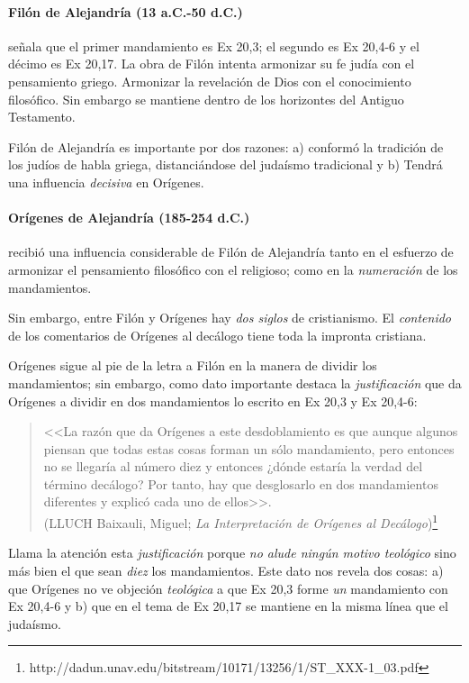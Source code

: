 \documentclass{article}
\begin{document}
\paragraph{Fil\'on de Alejandr\'{i}a  (13 a.C.-50 d.C.)}

se\~nala que el primer mandamiento es Ex 20,3; el segundo es Ex 20,4-6 y el d\'ecimo es Ex 20,17. La obra de Fil\'on intenta armonizar su fe jud\'{i}a con el pensamiento griego. Armonizar la revelaci\'on de Dios con el conocimiento filos\'ofico. Sin embargo se mantiene dentro de los horizontes del Antiguo Testamento.

Fil\'on de Alejandr\'{i}a es importante por dos razones: a) conform\'o la tradici\'on de los jud\'{i}os de habla griega, distanci\'andose del juda\'{i}smo tradicional y b) Tendr\'a una influencia \emph{decisiva} en Or\'{i}genes.

\paragraph{Or\'{i}genes de Alejandr\'{i}a (185-254 d.C.)}

recibi\'o una influencia considerable de Fil\'{o}n de Alejandr\'{i}a tanto en el esfuerzo de armonizar el pensamiento filos\'{o}fico con el religioso; como en la \emph{numeraci\'on} de los mandamientos.

Sin embargo, entre Fil\'on y Or\'{i}genes hay \emph{dos siglos} de cristianismo. El \emph{contenido} de los comentarios de Or\'{i}genes al dec\'alogo tiene toda la impronta cristiana.

Or\'{i}genes sigue al pie de la letra a Fil\'on en la manera de dividir los mandamientos; sin embargo, como dato importante destaca la \emph{justificaci\'on} que da Or\'{i}genes a dividir en dos mandamientos lo escrito en Ex 20,3 y Ex 20,4-6:

\begin{quote}
<<La razón que da Orígenes a este desdoblamiento es que aunque
algunos piensan que todas estas cosas forman un sólo mandamiento, pero
entonces no se llegaría al número diez y entonces ¿dónde estaría la verdad
del término decálogo? Por tanto, hay que desglosarlo en dos mandamientos
diferentes y explicó cada uno de ellos>>.\\
(LLUCH Baixauli, Miguel; \emph{La Interpretación de Orígenes al Decálogo})\footnote{http://dadun.unav.edu/bitstream/10171/13256/1/ST\_XXX-1\_03.pdf}
\end{quote}

\noindent
Llama la atenci\'on esta \emph{justificaci\'on} porque \emph{no alude ning\'un motivo teol\'ogico} sino m\'as bien el que sean \emph{diez} los mandamientos. Este dato nos revela dos cosas: a) que Or\'{i}genes no ve objeci\'on \emph{teol\'ogica} a que Ex 20,3 forme \emph{un} mandamiento con Ex 20,4-6 y b) que en el tema de Ex 20,17 se mantiene en la misma l\'{i}nea que el juda\'{i}smo.
\end{document}

